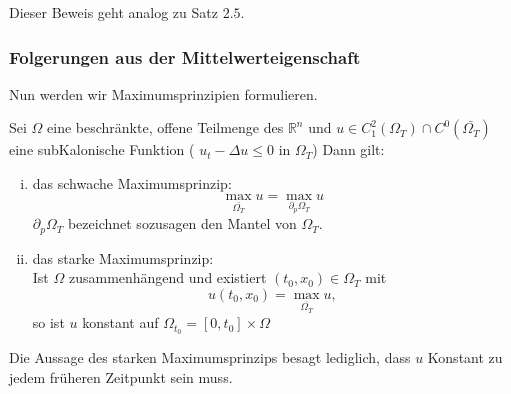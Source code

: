 \begin{beweis}
	Dieser Beweis geht analog zu Satz $2.5$.
\end{beweis}

\subsubsection{Folgerungen aus der Mittelwerteigenschaft} 
\label{sub:folgerungen_aus_der_mittelwerteigenschaft}
Nun werden wir Maximumsprinzipien formulieren.

\begin{satz}[Maximumsprinzipien]
	Sei $\Omega$ eine beschränkte, offene Teilmenge des $\mathbb{R}^n$ und $ u \in C^2_1(\Omega_T) \cap C^0( \bar{\Omega_T})$ eine subKalonische Funktion
	( $ u_t - \Delta u \leq 0$ in $\Omega_T$) Dann gilt:
	\begin{enumerate}[(i)]
		\item das schwache Maximumsprinzip:
		\[
			\max_{\bar{\Omega_T}} u = \max_{\partial_p \Omega_T} u
		\]
		$\partial_p \Omega_T$ bezeichnet sozusagen den Mantel von $\Omega_T$.
		\item das starke Maximumsprinzip: \\
		Ist $\Omega$ zusammenhängend und existiert $(t_0,x_0) \in \Omega_T$ mit 
		\[
			u(t_0,x_0) = \max_{\overline{\Omega_T}}u,
		\]
		so ist $u$ konstant auf $\Omega_{t_0}= [0,t_0] \times \Omega$
	\end{enumerate}
\end{satz}
\begin{bemerkung}
	Die Aussage des starken Maximumsprinzips besagt lediglich, dass $u$ Konstant zu jedem früheren Zeitpunkt sein muss.
\end{bemerkung}

